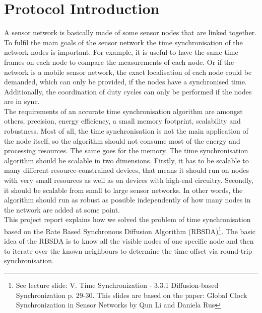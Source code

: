 \documentclass{llncs}
\begin{document}
\section{Protocol Introduction}
A sensor network is basically made of some sensor nodes that are linked together. To fulfil the main goals of the sensor network the time synchronisation of the network nodes is important.  For example, it is useful to have the same time frames on each node to compare the measurements of each node. Or if the network is a mobile sensor network, the exact localisation of each node could be demanded, which can only be provided, if the nodes have a synchronised time. Additionally, the coordination of duty cycles can only be performed if the nodes are in sync.\\
The requirements of an accurate time synchronisation algorithm are amongst others, precision, energy efficiency, a small memory footprint, scalability and robustness. Most of all, the time synchronisation is not the main application of the node itself, so the algorithm should not consume most of the energy and processing resources. The same goes for the memory.
\noindent The time synchronisation algorithm should be scalable in two dimensions. Firstly, it has to be scalable to many different resource-constrained devices, that means it should run on nodes with very small resources as well as on devices with high-end circuitry. Secondly, it should be scalable from small to large sensor networks. In other words, the algorithm should run as robust as possible independently of how many nodes in the network are added at some point.\\
\noindent This project report explains how we solved the problem of time synchronisation based on the Rate Based Synchronous Diffusion Algorithm (RBSDA)\footnote{See lecture slide: V. Time Synchronization - 3.3.1 Diffusion-based Synchronization p. 29-30. This slides are based on the paper: Global Clock Synchronization
in Sensor Networks by Qun Li and  Daniela Rus\cite{LiRus2006}}. The basic idea of the RBSDA is to know all the visible nodes of one specific node and then to iterate over the known neighbours to determine the time offset via round-trip synchronisation.\\
\end{document}
